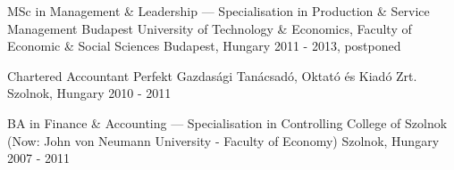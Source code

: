 


\begin{cventries}


  \cventry
    {MSc in Management \& Leadership — Specialisation in Production \& Service Management} %
    {Budapest University of Technology \& Economics, Faculty of Economic \& Social Sciences} %
    {Budapest, Hungary} %
    {2011 - 2013, postponed} %
    {} %
    {} %


  \cventry
    {Chartered Accountant} %
    {Perfekt Gazdasági Tanácsadó, Oktató és Kiadó Zrt.} %
    {Szolnok, Hungary} %
    {2010 - 2011} %
    {} %
    {} %


  \cventry
    {BA in Finance \& Accounting — Specialisation in Controlling} %
    {College of Szolnok (Now: John von Neumann University - Faculty of Economy)} %
    {Szolnok, Hungary} %
    {2007 - 2011} %
    {} %
    {} %
    

\end{cventries}
